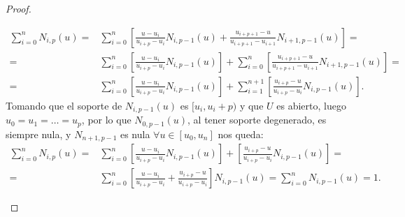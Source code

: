 \documentclass[11pt]{book}
\theoremstyle{plain} %
\theoremstyle{definition} %
\theoremstyle{definition} %
\begin{document}
\begin{proof}
\begin{enumerate}
\begin{itemize}
                                                  
                    \begin{align*}
                        \sum_{i=0}^{n} N_{i,p}(u) =& \sum_{i=0}^{n} \left[\frac{u - u_i}{u_{i+p} - u_i} N_{i,p-1}(u) + \frac{u_{i+p+1} - u}{u_{i+p+1} - u_{i+1}} N_{i+1,p-1}(u)\right]=\\
                                                  =& \sum_{i=0}^{n} \left[ \frac{u - u_i}{u_{i+p} - u_i} N_{i,p-1}(u) \right] + \sum_{i=0}^{n} \left[ \frac{u_{i+p+1} - u}{u_{i+p+1} - u_{i+1}} N_{i+1,p-1}(u) \right]=\\
                                                  =& \sum_{i=0}^{n} \left[ \frac{u - u_i}{u_{i+p} - u_i} N_{i,p-1}(u) \right] + \sum_{i=1}^{n+1} \left[ \frac{u_{i+p} - u}{u_{i+p} - u_{i}} N_{i,p-1}(u) \right].
                    \end{align*}
                    Tomando que el soporte de $N_{i,p-1}(u)$ es $[u_i,u_i+p)$ y que $U$ es abierto, luego $u_0=u_1=\dots = u_p$, por lo que $N_{0,p-1}(u)$, al tener soporte degenerado, es siempre nula, y $N_{n+1,p-1}$ es nula $\forall u \in [u_0, u_n]$ nos queda:
                    \begin{align*}
                        \sum_{i=0}^{n} N_{i,p}(u) =& \sum_{i=0}^{n} \left[ \frac{u - u_i}{u_{i+p} - u_i} N_{i,p-1}(u) \right] + \left[ \frac{u_{i+p} - u}{u_{i+p} - u_{i}} N_{i,p-1}(u) \right] =\\
                                                  =& \sum_{i=0}^{n} \left[ \frac{u - u_i}{u_{i+p} - u_i} + \frac{u_{i+p} - u}{u_{i+p} - u_{i}}  \right]N_{i,p-1}(u) = \sum_{i=0}^{n}N_{i,p-1}(u) = 1.
                    \end{align*}
                \end{itemize}
    \end{enumerate}
\end{proof}
\end{document}
